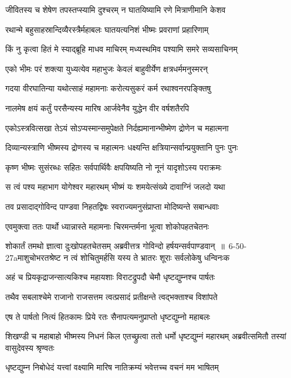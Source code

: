 \twolineshloka
{जीवितस्य च शेषेण तपस्तप्स्यामि दुश्चरम्}
{न घातयिष्यामि रणे मित्राणीमानि केशव}


\twolineshloka
{रथान्मे बहुसाहस्रान्दिव्यैरस्त्रैर्महाबलः}
{घातयत्यनिशं भीष्मः प्रवराणां प्रहारिणाम्}


\twolineshloka
{किं नु कृत्वा हितं मे स्याद्ब्रूहि माधव माचिरम्}
{मध्यस्थमिव पश्यामि समरे सव्यसाचिनम्}


\twolineshloka
{एको भीमः परं शक्त्या युध्यत्येव महाभुजः}
{केवलं बाहुवीर्येण क्षत्रधर्ममनुस्मरन्}


\twolineshloka
{गदया वीरघातिन्या यथोत्साहं महामनाः}
{करोत्यसुकरं कर्म रथाश्वनरपङ्क्तिषु}


\twolineshloka
{नालमेष क्षयं कर्तुं परसैन्यस्य मारिष}
{आर्जवेनैव युद्धेन वीर वर्षशतैरपि}


\twolineshloka
{एकोऽस्त्रवित्सखा तेऽयं सोऽप्यस्मान्समुपेक्षते}
{निर्दह्यमानान्भीष्मेण द्रोणेन च महात्मना}


\twolineshloka
{दिव्यान्यस्त्राणि भीष्मस्य द्रोणस्य च महात्मनः}
{धक्ष्यन्ति क्षत्रियान्सर्वान्प्रयुक्तानि पुनः पुनः}


\twolineshloka
{कृष्ण भीष्मः सुसंरब्धः सहितः सर्वपार्थिवैः}
{क्षपयिष्यति नो नूनं यादृशोऽस्य पराक्रमः}


\twolineshloka
{स त्वं पश्य महाभाग योगेश्वर महारथम्}
{भीष्मं यः शमयेत्संख्ये दावाग्निं जलदो यथा}


\twolineshloka
{तव प्रसादाद्गोविन्द पाण्डवा निहतद्विषः}
{स्वराज्यमनुसंप्राप्ता मोदिष्यन्ते सबान्धवाः}


\twolineshloka
{एवमुक्त्वा ततः पार्थो ध्यान्नास्ते महामनाः}
{चिरमन्तर्मना भूत्वा शोकोपहतचेतनः}


\threelineshloka
{शोकार्तं तमथो ज्ञात्वा दुःखोपहतचेतसम्}
{अब्रवीत्तत्र गोविन्दो हर्षयन्सर्वपाण्डवान् ॥ 6-50-27aमाशुचोभरतश्रेष्ट न त्वं शोचितुमर्हसि}
{यस्य ते भ्रातरः शूराः सर्वलोकेषु धन्विनःक}


\twolineshloka
{अहं च प्रियकृद्राजन्सात्यकिश्च महायशाः}
{विराटद्रुपदौ चेमौ धृष्टद्युम्नश्च पार्षतः}


\twolineshloka
{तथैव सबलाश्चेमे राजानो राजसत्तम}
{त्वत्प्रसादं प्रतीक्षन्ते त्वद्भक्ताश्च विशांपते}


\twolineshloka
{एष ते पार्षतो नित्यं हितकामः प्रिये रतः}
{सैनापत्यमनुप्राप्तो धृष्टद्युम्नो महाबलः}


\threelineshloka
{शिखण्डी च महाबाहो भीष्मस्य निधनं किल}
{एतच्छ्रुत्वा ततो धर्मो धृष्टद्युम्नं महारथम्}
{अब्रवीत्समितौ तस्यां वासुदेवस्य श्रृण्वतः}


\twolineshloka
{धृष्टद्युम्न निबोधेदं यत्त्वां वक्ष्यामि मारिष}
{नातिक्रम्यं भवेत्तच्च वचनं मम भाषितम्}


